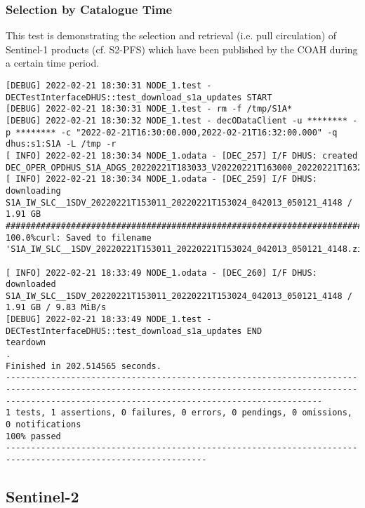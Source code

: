 \documentclass[dec_sum_main.tex]{subfiles}
\begin{document}
\subsubsection{Selection by Catalogue Time}
This test is demonstrating the selection and retrieval (i.e. pull circulation) of Sentinel-1 products (cf. S2-PFS) which have been published by the COAH during a certain time period. \newline

 \newline

\begin{Verbatim}[fontsize=\tiny]
[DEBUG] 2022-02-21 18:30:31 NODE_1.test - DECTestInterfaceDHUS::test_download_s1a_updates START
[DEBUG] 2022-02-21 18:30:31 NODE_1.test - rm -f /tmp/S1A*
[DEBUG] 2022-02-21 18:30:32 NODE_1.test - decODataClient -u ******** -p ******** -c "2022-02-21T16:30:00.000,2022-02-21T16:32:00.000" -q dhus:s1:S1A -L /tmp -r
[ INFO] 2022-02-21 18:30:34 NODE_1.odata - [DEC_257] I/F DHUS: created DEC_OPER_OPDHUS_S1A_ADGS_20220221T183033_V20220221T163000_20220221T163200_1_0.xml
[ INFO] 2022-02-21 18:30:34 NODE_1.odata - [DEC_259] I/F DHUS: downloading S1A_IW_SLC__1SDV_20220221T153011_20220221T153024_042013_050121_4148 / 1.91 GB
#################################################################################################################################################################################################### 100.0%curl: Saved to filename 'S1A_IW_SLC__1SDV_20220221T153011_20220221T153024_042013_050121_4148.zip'

[ INFO] 2022-02-21 18:33:49 NODE_1.odata - [DEC_260] I/F DHUS: downloaded S1A_IW_SLC__1SDV_20220221T153011_20220221T153024_042013_050121_4148 / 1.91 GB / 9.83 MiB/s
[DEBUG] 2022-02-21 18:33:49 NODE_1.test - DECTestInterfaceDHUS::test_download_s1a_updates END
teardown
.
Finished in 202.514565 seconds.
-----------------------------------------------------------------------------------------------------------------------------------------------------------------------------------------------------------
1 tests, 1 assertions, 0 failures, 0 errors, 0 pendings, 0 omissions, 0 notifications
100% passed
--------------------------------------------------------------------------------------------------------------
\end{Verbatim}

\subsection{Sentinel-2}
\end{document}
